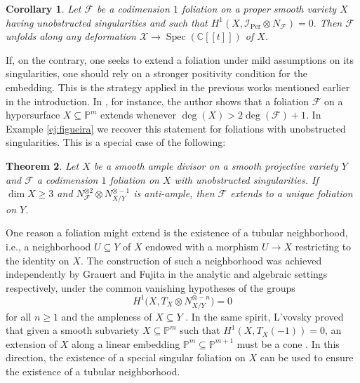 \documentclass[reqno]{amsart}
\theoremstyle{plain}
\newcommand\C{\mathbb{C}}
\renewcommand\P{\mathbb{P}}
\newcommand{\I}{\mathcal{I}}
\renewcommand{\I}{\mathcal{I}}
\newcommand{\X}{\mathcal{X}}
\newcommand{\F}{\mathscr{F}}
\DeclareMathOperator{\Spec}{Spec}
\DeclareMathOperator{\Per}{Per}
\newcounter{Theorem}
\newtheorem{theorem}{Theorem}[section]
\newtheorem{corollary}[theorem]{Corollary}
\theoremstyle{definition}
\theoremstyle{named}
\begin{document}
\begin{corollary}
    Let $\F$ be a codimension $1$ foliation on a proper smooth variety $X$ having unobstructed singularities and such that $H^1(X,\I_{\Per}\otimes N_\F)=0.$ Then $\F$  unfolds along any deformation $\X\to \Spec(\C[[t]])$ of $X$.
\end{corollary}

If, on the contrary, one seeks to extend a foliation under mild assumptions on its singularities, one should rely on a stronger positivity condition for the embedding. This is the strategy applied in the previous works mentioned earlier in the introduction. In \cite{figueira2023extensions}, for instance, the author shows that a foliation $\F$ on a hypersurface $X\subseteq \P^m$ extends whenever $\deg(X)> 2 \deg(\F) +1$. In Example \ref{ej:figueira} we recover this statement for foliations with unobstructed singularities. This is a special case of the following: 

\begin{theorem}
Let $X$ be a smooth ample divisor on a smooth projective variety $Y$ and $\F$ a codimension $1$ foliation on $X$ with unobstructed singularities. If $\dim X\geqslant 3$ and $N_\F^{\otimes 2}\otimes N_{X/Y}^{\otimes -1}$ is anti-ample, then $\F$ extends to a unique foliation on $Y$. 
\end{theorem}


One reason a foliation might extend is the existence of a tubular neighborhood, i.e., a neighborhood $U\subseteq Y$ of $X$ endowed with a morphism $U\to X$ restricting to the identity on $X$. The construction of such a neighborhood was achieved independently by Grauert and Fujita in the analytic and algebraic settings respectively, under the common vanishing hypotheses of the groups
\[
H^1\big(X,T_X\otimes N_{X/Y}^{\otimes -n}\big) = 0
\]
for all $n\geqslant 1$ and the ampleness of $X\subseteq Y$ \cite{grauert1962modifikationen, fujita1983rational}. In the same spirit, L'vovsky proved that given a smooth subvariety $X\subseteq \P^m$ such that $H^1(X,T_X(-1)) = 0$, an extension of $X$ along a linear embedding $\P^m\subseteq \P^{m+1}$ must be a cone \cite{l1992extensions}. In this direction, the existence of a special singular foliation on $X$ can be used to ensure the existence of a tubular neighborhood.
\end{document}
